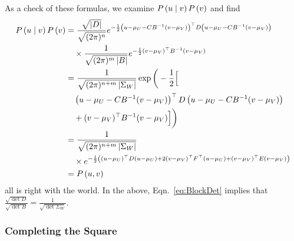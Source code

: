 As a check of these formulas, we examine $P\left(u \mid v \right) P\left(v
\right)$ and find
\begin{align*}
  P\left(u \mid v \right) P\left(v \right) &= \frac{\sqrt{\left| D
      \right|}} {\sqrt{(2\pi)^n}} e^{ -\frac{1}{2} \left(u - \mu_U -
      CB^{-1}(v - \mu_V) \right)^\top D \left(u - \mu_U -
      CB^{-1}(v - \mu_V) \right)
  } \\
  &\quad \times \frac{1}{\sqrt{(2\pi)^m \left| B \right|}} e^{ -\frac{1}{2}
    (v-\mu_V)^\top B^{-1} (v-\mu_V)}\\
    &= \frac{1} {\sqrt{(2\pi)^{n+m} \left| \Sigma_W
      \right| }} \exp \bigg( -\frac{1}{2} \Big[ \\
  &\quad \left( u - \mu_U - CB^{-1}(v - \mu_V) \right)^\top D
       \left(u - \mu_U - CB^{-1}(v - \mu_V) \right)  \\
     &\quad + (v-\mu_V)^\top B^{-1} (v-\mu_V) \Big]\bigg)\\
     &= \frac{1} {\sqrt{(2\pi)^{n+m} \left| \Sigma_W \right| }}\\
     &\quad\times e^{ -\frac{1}{2} \left((u-\mu_U)^\top D (u-\mu_U) +
         2 (v-\mu_V)^\top F^\top (u-\mu_U) +
         (v-\mu_V)^\top E (v-\mu_V)\right)}\\
     &= P \left(u,v \right)
\end{align*}
all is right with the world.  In the above, Eqn.~\eqref{eq:BlockDet}
implies that $\frac{\sqrt{\det{D}}}{\sqrt{\det{B}}} =
\frac{1}{\sqrt{\det{\Sigma_W}}}$.


\subsubsection{Completing the Square}


